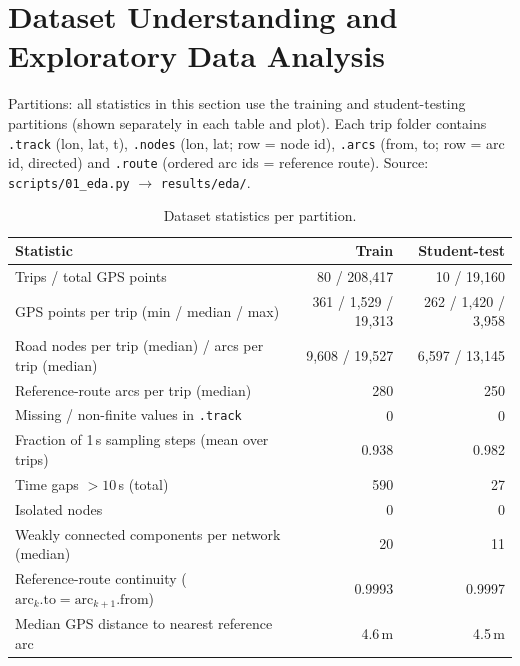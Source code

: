 \documentclass[10pt,a4paper]{article}
\newcommand{\code}[1]{\texttt{\small #1}}
\newcommand{\note}[1]{{\noindent\small\color{black!65}#1\par}}
\begin{document}
\section{Dataset Understanding and Exploratory Data Analysis}
\note{Partitions: all statistics in this section use the training and student-testing partitions (shown separately in each table and plot). Each trip folder contains \code{.track} (lon, lat, t), \code{.nodes} (lon, lat; row = node id), \code{.arcs} (from, to; row = arc id, directed) and \code{.route} (ordered arc ids = reference route). Source: \code{scripts/01\_eda.py} $\rightarrow$ \code{results/eda/}.}

\begin{table}[H]\centering\small
\caption{Dataset statistics per partition.}
\begin{tabular}{lrr}
\toprule
Statistic & Train & Student-test\\
\midrule
Trips / total GPS points & 80 / 208{,}417 & 10 / 19{,}160\\
GPS points per trip (min / median / max) & 361 / 1{,}529 / 19{,}313 & 262 / 1{,}420 / 3{,}958\\
Road nodes per trip (median) / arcs per trip (median) & 9{,}608 / 19{,}527 & 6{,}597 / 13{,}145\\
Reference-route arcs per trip (median) & 280 & 250\\
Missing / non-finite values in \code{.track} & 0 & 0\\
Fraction of 1\,s sampling steps (mean over trips) & 0.938 & 0.982\\
Time gaps $>10$\,s (total) & 590 & 27\\
Isolated nodes & 0 & 0\\
Weakly connected components per network (median) & 20 & 11\\
Reference-route continuity ($\text{arc}_k.\text{to} = \text{arc}_{k+1}.\text{from}$) & 0.9993 & 0.9997\\
Median GPS distance to nearest reference arc & 4.6\,m & 4.5\,m\\
\bottomrule
\end{tabular}
\end{table}
\end{document}
